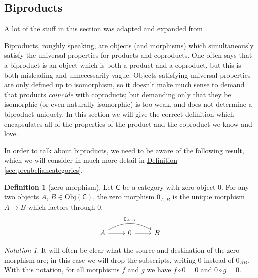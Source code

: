 \documentclass[a4paper]{report}
\newcommand{\defn}[1]{\ul{#1}}
\newcommand{\Obj}{\mathrm{Obj}}
\theoremstyle{definition}
\newtheorem{definition}{Definition}[section]
\theoremstyle{plain}
\theoremstyle{remark}
\newtheorem{notation}{Notation}[section]
\begin{document}
\subsection{Biproducts} \label{sec:biproducts}
A lot of the stuff in this section was adapted and expanded from \cite{annoying-precision-meditation}.

Biproducts, roughly speaking, are objects (and morphisms) which simultaneously satisfy the universal properties for products and coproducts. One often says that a biproduct is an object which is both a product and a coproduct, but this is both misleading and unnecessarily vague. Objects satisfying universal properties are only defined up to isomorphism, so it doesn't make much sense to demand that products \emph{coincide} with coproducts; but demanding only that they be isomorphic (or even naturally isomorphic) is too weak, and does not determine a biproduct uniquely. In this section we will give the correct definition which encapsulates all of the properties of the product and the coproduct we know and love.

In order to talk about biproducts, we need to be aware of the following result, which we will consider in much more detail in \hyperref[sec:preabeliancategories]{Definition \ref*{sec:preabeliancategories}}.

\begin{definition}[zero morphism]
  Let $\mathsf{C}$ be a category with zero object $0$. For any two objects $A$, $B \in \Obj(\mathsf{C})$, the \defn{zero morphism} $0_{A,B}$ is the unique morphism $A \to B$ which factors through $0$.
  \begin{equation*}
    \begin{tikzcd}
      A
      \arrow[rr, bend left, "0_{A, B}"]
      \arrow[r]
      & 0
      \arrow[r]
      & B
    \end{tikzcd}
  \end{equation*}
\end{definition}

\begin{notation}
  It will often be clear what the source and destination of the zero morphism are; in this case we will drop the subscripts, writing $0$ instead of $0_{AB}$. With this notation, for all morphisms $f$ and $g$ we have $f \circ 0 = 0$ and $0 \circ g = 0$.
\end{notation}
\end{document}
